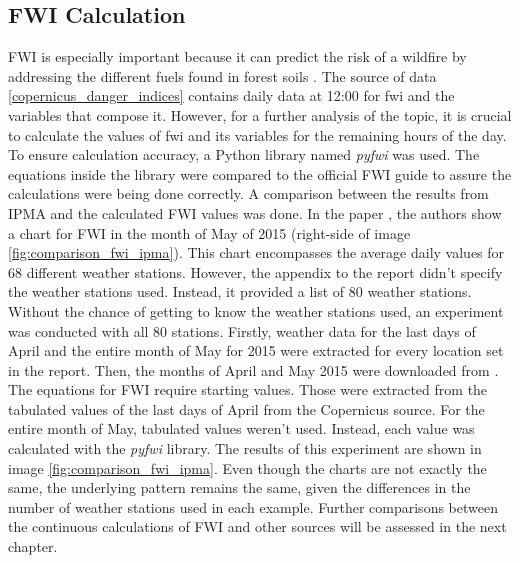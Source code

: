 \subsection{FWI Calculation}
FWI is especially important because it can predict the risk of a wildfire by addressing the different fuels found in forest soils \cite{IPMA2024}. The source of data \ref{copernicus_danger_indices} contains daily data at 12:00 for fwi and the variables that compose it. However, for a further analysis of the topic, it is crucial to calculate the values of fwi and its variables for the remaining hours of the day. To ensure calculation accuracy, a Python library named \textit{pyfwi} \cite{buckinha2024} was used. The equations inside the library were compared to the official FWI guide \cite{van1985equations} to assure the calculations were being done correctly.
A comparison between the results from IPMA and the calculated FWI values was done. In the paper \cite{ipma2015}, the authors show a chart for FWI in the month of May of 2015 (right-side of image \ref{fig:comparison_fwi_ipma}). This chart encompasses the average daily values for 68 different weather stations. However, the appendix to the report didn't specify the weather stations used. Instead, it provided a list of 80 weather stations. Without the chance of getting to know the weather stations used, an experiment was conducted with all 80 stations. Firstly, weather data for the last days of April and the entire month of May for 2015 were extracted for every location set in the report. Then, the months of April and May 2015 were downloaded from \cite{CopernicusCDS2019}. The equations for FWI require starting values. Those were extracted from the tabulated values of the last days of April from the Copernicus source. For the entire month of May, tabulated values weren't used. Instead, each value was calculated with the \textit{pyfwi} library.
The results of this experiment are shown in image \ref{fig:comparison_fwi_ipma}. Even though the charts are not exactly the same, the underlying pattern remains the same, given the differences in the number of weather stations used in each example. Further comparisons between the continuous calculations of FWI and other sources will be assessed in the next chapter.

